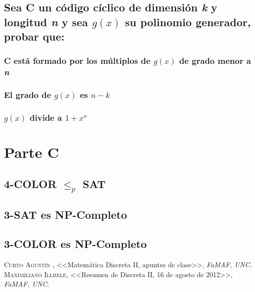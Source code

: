 \documentclass[12pt,a4paper]{report}
\begin{document}
	\section{Sea C un código cíclico de dimensión \textit{k} y longitud \textit{n} y sea $g(x)$ su polinomio generador, probar que:}
	
		\subsection{C está formado por los múltiplos de $g(x)$ de grado menor a \textit{n}}
		
		\subsection{El grado de $g(x)$ es $n-k$}
		
		\subsection{$g(x)$ divide a $1+x^{n}$}
		
		

\chapter{Parte C}

	\section{4-COLOR $\leq_{\textit{p}}$ SAT}
	
	\section{3-SAT es NP-Completo}
	
	\section{3-COLOR es NP-Completo}
	
	
\begin{thebibliography}{X}
 \textsc{Curto Agustín },
<<Matemática Discreta II, apuntes de clase>>,
\textit{FaMAF, UNC}.
 \textsc{Maximiliano Illbele},
<<Resumen de Discreta II, 16 de agosto de 2012>>,
\textit{FaMAF, UNC}.
\end{thebibliography}
\end{document}
